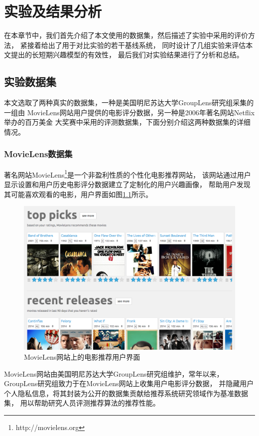 \chapter{实验及结果分析}
在本章节中，我们首先介绍了本文使用的数据集，然后描述了实验中采用的评价方法，
紧接着给出了用于对比实验的若干基线系统，
同时设计了几组实验来评估本文提出的长短期兴趣模型的有效性，
最后我们对实验结果进行了分析和总结。

\section{实验数据集}
本文选取了两种真实的数据集，一种是美国明尼苏达大学GroupLens研究组采集的一组由
MovieLens网站用户提供的电影评分数据，另一种是2006年著名网站Netflix举办的百万美金
大奖赛中采用的评测数据集，下面分别介绍这两种数据集的详细情况。

\subsection{MovieLens数据集}
著名网站MovieLens\footnote{http://movielens.org}是一个非盈利性质的个性化电影推荐网站，
该网站通过用户显示设置和用户历史电影评分数据建立了定制化的用户兴趣画像，
帮助用户发现其可能喜欢观看的电影，用户界面如图\ref{fig:movielens}所示。

\begin{figure}[htbp]
\centering
\includegraphics[scale=0.36]{images/movielens.png}
\caption{MovieLens网站上的电影推荐用户界面}
\label{fig:movielens}
\end{figure}

MovieLens网站由美国明尼苏达大学GroupLens研究组维护，常年以来，
GroupLens研究组致力于在MovieLens网站上收集用户电影评分数据，
并隐藏用户个人隐私信息，将其封装为公开的数据集贡献给推荐系统研究领域作为基准数据集，
用以帮助研究人员评测推荐算法的推荐性能。

